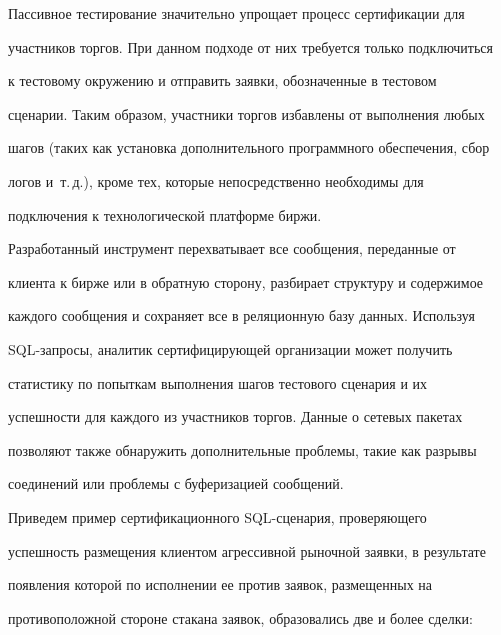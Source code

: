 Пассивное тестирование значительно упрощает процесс сертификации для


участников торгов. При данном подходе от них требуется только подключиться


к тестовому окружению и отправить заявки, обозначенные в тестовом


сценарии. Таким образом, участники торгов избавлены от выполнения любых


шагов (таких как установка дополнительного программного обеспечения, сбор


логов и~т.\,д.), кроме тех, которые непосредственно необходимы для


подключения к технологической платформе биржи.





Разработанный инструмент перехватывает все сообщения, переданные от


клиента к бирже или в обратную сторону, разбирает структуру и содержимое


каждого сообщения и сохраняет все в реляционную базу данных. Используя


SQL-за\-про\-сы, аналитик сертифицирующей организации может получить


статистику по попыткам выполнения шагов тестового сценария и их


успешности для каждого из участников торгов. Данные о сетевых пакетах


позволяют также обнаружить дополнительные проблемы, такие как разрывы


соединений или проблемы с буферизацией сообщений.





Приведем пример сертификационного SQL-сце\-на\-рия, проверяющего


успешность размещения клиентом агрессивной рыночной заявки, в результате


появления которой по исполнении ее против заявок, размещенных на


противоположной стороне стакана заявок, образовались две и более сделки:





\vspace*{-4pt}





\noindent


